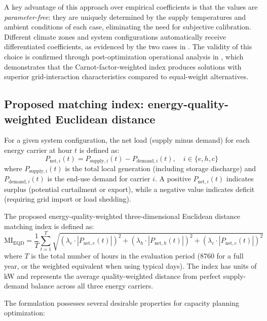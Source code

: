 A key advantage of this approach over empirical coefficients is that the values are \emph{parameter-free}: they are uniquely determined by the supply temperatures and ambient conditions of each case, eliminating the need for subjective calibration. Different climate zones and system configurations automatically receive differentiated coefficients, as evidenced by the two cases in . The validity of this choice is confirmed through post-optimization operational analysis in , which demonstrates that the Carnot-factor-weighted index produces solutions with superior grid-interaction characteristics compared to equal-weight alternatives.

\subsection{Proposed matching index: energy-quality-weighted Euclidean distance}
\label{sec:proposed_index}

For a given system configuration, the net load (supply minus demand) for each energy carrier at hour $t$ is defined as:
\begin{equation}
    P_{\text{net},i}(t) = P_{\text{supply},i}(t) - P_{\text{demand},i}(t), \quad i \in \{e, h, c\}
    \label{eq:net_load}
\end{equation}
where $P_{\text{supply},i}(t)$ is the total local generation (including storage discharge) and $P_{\text{demand},i}(t)$ is the end-use demand for carrier $i$. A positive $P_{\text{net},i}(t)$ indicates surplus (potential curtailment or export), while a negative value indicates deficit (requiring grid import or load shedding).

The proposed energy-quality-weighted three-dimensional Euclidean distance matching index is defined as:
\begin{equation}
    \text{MI}_{\text{EQD}} = \frac{1}{T} \sum_{t=1}^{T} \sqrt{ \left(\lambda_e \cdot |P_{\text{net},e}(t)|\right)^2 + \left(\lambda_h \cdot |P_{\text{net},h}(t)|\right)^2 + \left(\lambda_c \cdot |P_{\text{net},c}(t)|\right)^2 }
    \label{eq:mi_eqd}
\end{equation}
where $T$ is the total number of hours in the evaluation period (8760 for a full year, or the weighted equivalent when using typical days). The index has units of \si{kW} and represents the average quality-weighted distance from perfect supply-demand balance across all three energy carriers.

The formulation possesses several desirable properties for capacity planning optimization:

